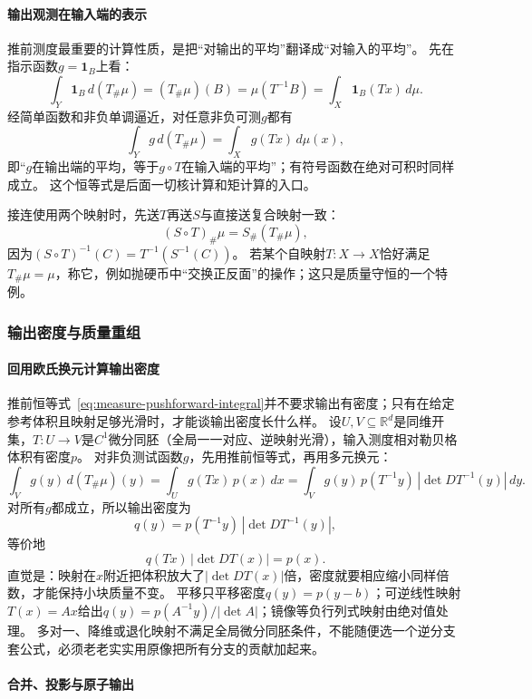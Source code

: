 \paragraph{输出观测在输入端的表示}

推前测度最重要的计算性质，是把“对输出的平均”翻译成“对输入的平均”。
先在指示函数$g=\mathbf 1_B$上看：
\[
 \int_Y\mathbf 1_B\,d(T_\#\mu)
 =(T_\#\mu)(B)=\mu(T^{-1}B)
 =\int_X\mathbf 1_B(Tx)\,d\mu.
\]
经简单函数和非负单调逼近，对任意非负可测$g$都有
\begin{equation}
 \int_Y g\,d(T_\#\mu)=\int_X g(Tx)\,d\mu(x),
 \label{eq:measure-pushforward-integral}
\end{equation}
即“$g$在输出端的平均，等于$g\circ T$在输入端的平均”；有符号函数在绝对可积时同样成立。
这个恒等式是后面一切核计算和矩计算的入口。

接连使用两个映射时，先送$T$再送$S$与直接送复合映射一致：
\[
 (S\circ T)_\#\mu=S_\#(T_\#\mu),
\]
因为$(S\circ T)^{-1}(C)=T^{-1}(S^{-1}(C))$。
若某个自映射$T:X\to X$恰好满足$T_\#\mu=\mu$，称它，例如抛硬币中“交换正反面”的操作；这只是质量守恒的一个特例。

\subsubsection{输出密度与质量重组}

\paragraph{回用欧氏换元计算输出密度}

推前恒等式~\eqref{eq:measure-pushforward-integral}并不要求输出有密度；只有在给定参考体积且映射足够光滑时，才能谈输出密度长什么样。
设$U,V\subseteq\mathbb R^d$是同维开集，$T:U\to V$是$C^1$微分同胚（全局一一对应、逆映射光滑），输入测度相对勒贝格体积有密度$p$。
对非负测试函数$g$，先用推前恒等式，再用多元换元：
\[
 \int_Vg(y)\,d(T_\#\mu)(y)
 =\int_U g(Tx)\,p(x)\,dx
 =\int_V g(y)\,p(T^{-1}y)\,|\det DT^{-1}(y)|\,dy.
\]
对所有$g$都成立，所以输出密度为
\[
 q(y)=p(T^{-1}y)\,|\det DT^{-1}(y)|,
\]
等价地
\[
 q(Tx)\,|\det DT(x)|=p(x).
\]
直觉是：映射在$x$附近把体积放大了$|\det DT(x)|$倍，密度就要相应缩小同样倍数，才能保持小块质量不变。
平移只平移密度$q(y)=p(y-b)$；可逆线性映射$T(x)=Ax$给出$q(y)=p(A^{-1}y)/|\det A|$；镜像等负行列式映射由绝对值处理。
多对一、降维或退化映射不满足全局微分同胚条件，不能随便选一个逆分支套公式，必须老老实实用原像把所有分支的贡献加起来。

\paragraph{合并、投影与原子输出}

